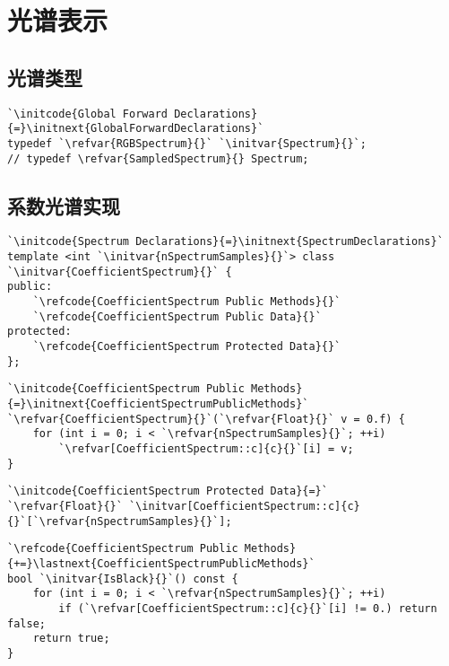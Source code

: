\section{光谱表示}\label{sec:光谱表示}

\subsection{光谱类型}\label{sub:光谱类型}
\begin{lstlisting}
`\initcode{Global Forward Declarations}{=}\initnext{GlobalForwardDeclarations}`
typedef `\refvar{RGBSpectrum}{}` `\initvar{Spectrum}{}`;
// typedef \refvar{SampledSpectrum}{} Spectrum;
\end{lstlisting}

\subsection{系数光谱实现}\label{sub:系数光谱实现}
\begin{lstlisting}
`\initcode{Spectrum Declarations}{=}\initnext{SpectrumDeclarations}`
template <int `\initvar{nSpectrumSamples}{}`> class `\initvar{CoefficientSpectrum}{}` {
public:
    `\refcode{CoefficientSpectrum Public Methods}{}`
    `\refcode{CoefficientSpectrum Public Data}{}`
protected:
    `\refcode{CoefficientSpectrum Protected Data}{}`
};
\end{lstlisting}

\begin{lstlisting}
`\initcode{CoefficientSpectrum Public Methods}{=}\initnext{CoefficientSpectrumPublicMethods}`
`\refvar{CoefficientSpectrum}{}`(`\refvar{Float}{}` v = 0.f) {
    for (int i = 0; i < `\refvar{nSpectrumSamples}{}`; ++i)
        `\refvar[CoefficientSpectrum::c]{c}{}`[i] = v;
}
\end{lstlisting}

\begin{lstlisting}
`\initcode{CoefficientSpectrum Protected Data}{=}`
`\refvar{Float}{}` `\initvar[CoefficientSpectrum::c]{c}{}`[`\refvar{nSpectrumSamples}{}`];
\end{lstlisting}

\begin{lstlisting}
`\refcode{CoefficientSpectrum Public Methods}{+=}\lastnext{CoefficientSpectrumPublicMethods}`
bool `\initvar{IsBlack}{}`() const {
    for (int i = 0; i < `\refvar{nSpectrumSamples}{}`; ++i)
        if (`\refvar[CoefficientSpectrum::c]{c}{}`[i] != 0.) return false;
    return true;
}
\end{lstlisting}